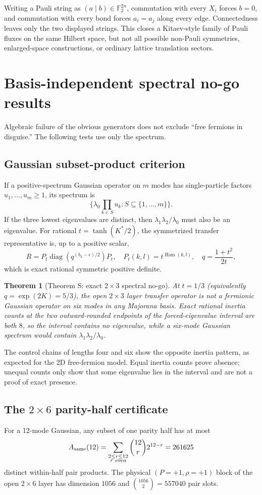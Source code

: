 \documentclass[11pt]{article}
\newtheorem{theorem}{Theorem}[section]
\begin{document}
Writing a Pauli string as $(a\mid b)\in\mathbb F_2^{2n}$, commutation with every $X_i$ forces $b=0$, and commutation with every bond forces $a_i=a_j$ along every edge. Connectedness leaves only the two displayed strings. This closes a Kitaev-style family of Pauli fluxes on the same Hilbert space, but not all possible non-Pauli symmetries, enlarged-space constructions, or ordinary lattice translation sectors.

\section{Basis-independent spectral no-go results}
Algebraic failure of the obvious generators does not exclude ``free fermions in disguise.'' The following tests use only the spectrum.

\subsection{Gaussian subset-product criterion}
If a positive-spectrum Gaussian operator on $m$ modes has single-particle factors $u_1,\ldots,u_m\geq1$, its spectrum is
\[
 \{\lambda_0\prod_{k\in S}u_k:S\subseteq\{1,\ldots,m\}\}.
\]
If the three lowest eigenvalues are distinct, then $\lambda_1\lambda_2/\lambda_0$ must also be an eigenvalue. For rational $t=\tanh(K^*/2)$, the symmetrized transfer representative is, up to a positive scalar,
\[
 R=P_t\operatorname{diag}(q^{(b_k-\epsilon)/2})P_t,
 \quad P_t(k,l)=t^{\operatorname{Ham}(k,l)},\quad q=\frac{1+t^2}{2t},
\]
which is exact rational symmetric positive definite.

\begin{theorem}[Theorem S: exact $2\times3$ spectral no-go]
At $t=1/3$ (equivalently $q=\exp(2K)=5/3$), the open $2\times3$ layer transfer operator is not a fermionic Gaussian operator on six modes in any Majorana basis. Exact rational inertia counts at the two outward-rounded endpoints of the forced-eigenvalue interval are both $8$, so the interval contains no eigenvalue, while a six-mode Gaussian spectrum would contain $\lambda_1\lambda_2/\lambda_0$.
\end{theorem}

The control chains of lengths four and six show the opposite inertia pattern, as expected for the 2D free-fermion model. Equal inertia counts prove absence; unequal counts only show that some eigenvalue lies in the interval and are not a proof of exact presence.

\subsection{The $2\times6$ parity-half certificate}
For a 12-mode Gaussian, any subset of one parity half has at most
\[
 A_{\rm same}(12)=\sum_{\substack{2\le r\le12\\r\ \mathrm{even}}}\binom{12}{r}2^{12-r}=261625
\]
distinct within-half pair products. The physical $(P=+1,\rho=+1)$ block of the open $2\times6$ layer has dimension $1056$ and $\binom{1056}{2}=557040$ pair slots.
\end{document}
